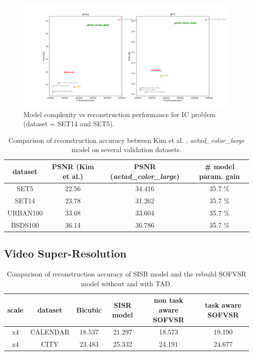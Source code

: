 \begin{figure}[!htbp]
	\centering
	\includegraphics[width=18cm]{figures/psnr_complexity_ic}
	\caption{Model complexity vs reconstruction performance for \ac{IC}
	problem (dataset = SET14 and SET5).}
  \label{fig:psnr_complexity_ic}
\end{figure}

\begin{table}[!htbp]
	\begin{center}
	\begin{tabular}{c|c|c|c}
	dataset & PSNR (Kim et al.) & PSNR (\textit{aetad\_color\_large})
	& \# model param. gain \\
	\hline
  SET5 & 22.56 & 34.416 & 35.7 \%\\
	SET14 & 23.78 & 31.262 & 35.7 \% \\
	URBAN100 & 33.68 & 33.604 & 35.7 \% \\
	BSDS100 & 36.14 & 36.786 & 35.7 \% \\
	\end{tabular}
	\caption{Comparison of reconstruction accuracy between Kim et al. \cite{TAID},
	\textit{aetad\_color\_large} model on several validation datasets. }
	\label{table:icperformance}
	\end{center}
\end{table}

\subsection{Video Super-Resolution}
\label{sec:Experiments_VSR}

\begin{table}[!htbp]
	\begin{center}
	\begin{tabular}{c|c|c|c|c|c}
	scale & dataset & Bicubic & \ac{SISR} model & non task aware SOFVSR
	& task aware SOFVSR \\
	\hline
  x4 & CALENDAR & 18.537 & 21.297 & 18.573  & 19.190 \\
	x4 & CITY & 23.483 & 25.332 & 24.191 & 24.677 \\
	\end{tabular}
	\caption{Comparison of reconstruction accuracy of \ac{SISR} model and
	the rebuild SOFVSR model without and with \ac{TAD}.}
	\label{table:vsrperformance}
	\end{center}
\end{table}

